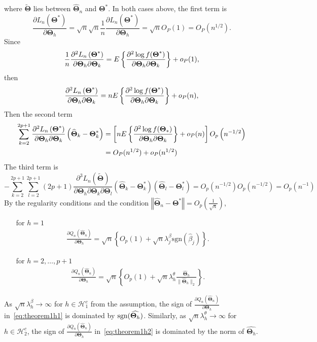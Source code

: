 \documentclass[12pt,letter]{article}\usepackage[]{graphicx}\usepackage[]{color}
\newcommand{\bTheta}{\boldsymbol{\Theta}}
\begin{document}
where $\widetilde{\bTheta}$ lies between $\widehat{\bTheta}_{n}$ and $\bTheta^{*}$. In both cases above, the first term is
\[
\frac{\partial L_{n}\left(\boldsymbol{\Theta}^{*}\right)}{\partial\bTheta_{h}}=\sqrt{n}\sqrt{n}\frac{1}{n}\frac{\partial L_{n}\left(\boldsymbol{\Theta}^{*}\right)}{\partial\bTheta_{h}}=\sqrt{n}O_{P}(1)=O_{P}(n^{1/2}).
\]
Since 
\[
\frac{1}{n}\frac{\partial^{2}L_{n}\left(\boldsymbol{\Theta}^{*}\right)}{\partial\bTheta_{h}\partial\bTheta_{k}}=E\left\{ \frac{\partial^{2}\log f(\bTheta^{*})}{\partial\bTheta_{h}\partial\bTheta_{k}}\right\} +\op(1),
\]
then
\[
\frac{\partial^{2}L_{n}\left(\boldsymbol{\Theta}^{*}\right)}{\partial\bTheta_{h}\partial\bTheta_{k}}=nE\left\{ \frac{\partial^{2}\log f(\bTheta^{*})}{\partial\bTheta_{h}\partial\bTheta_{k}}\right\} +\op(n),
\]
Then the second term
\begin{align*}
\sum_{k=2}^{2p+1}\frac{\partial^{2}L_{n}\left(\boldsymbol{\Theta}^{*}\right)}{\partial\bTheta_{h}\partial\bTheta_{k}}\left(\widehat{\bTheta}_{k}-\bTheta_{k}^{*}\right) & =\left[nE\left\{ \frac{\partial^{2}\log f(\bTheta_{*})}{\partial\bTheta_{h}\partial\bTheta_{k}}\right\} +\op(n)\right]O_{p}\left(n^{-1/2}\right)\\
& =O_{P}(n^{1/2})+o_{P}(n^{1/2})
\end{align*}
The third term is 
\[
-\sum_{k=2}^{2p+1}\sum_{l=2}^{2p+1}  (2p+1)\frac{\partial^{3}L_{n}(\widetilde{\bTheta})}{\partial\bTheta_{h}\partial\bTheta_{k}\partial\bTheta_{l}}\left(\widehat{\bTheta}_{k}-\bTheta_{k}^{*}\right)\left(\widehat{\bTheta}_{l}-\bTheta_{l}^{*}\right)=O_{p}\left(n^{-1/2}\right)O_{p}\left(n^{-1/2}\right)=O_{p}\left(n^{-1}\right)
\]
By the regularity conditions and the condition $\left\Vert \widehat{\boldsymbol{\Theta}}_{n}-\boldsymbol{\Theta}^{*}\right\Vert =O_{p}\left(\frac{1}{\sqrt{n}}\right)$,
\begin{itemize}
	\item[for] $h=1$  
	\begin{align}
\frac{\partial Q_{n}\left(\widehat{\boldsymbol{\Theta}}_{n}\right)}{\partial\bTheta_{h}}=\sqrt{n}\left\{ O_{p}(1)+\sqrt{n}\lambda_{j}^{\beta}\textrm{sgn}\left(\hat{\beta}_{j}\right)\right\} . \label{eq:theorem1h1}
\end{align}
\item[for] $h=2, \ldots, p+1$ 
	\begin{align}
\frac{\partial Q_{n}\left(\widehat{\boldsymbol{\Theta}}_{n}\right)}{\partial\bTheta_{h}}=\sqrt{n}\left\{ O_{p}(1)+\sqrt{n}\lambda_{h}^{\theta}\frac{\widehat{\bTheta}_{h}}{\|\widehat{\bTheta}_{h} \|_2}\right\} .\label{eq:theorem1h2}
\end{align}
\end{itemize}
As $\sqrt{n}\lambda_h^\beta\to\infty$ for $h\in\mathcal{H}_{1}^{c}$ from the assumption, the sign of $\frac{\partial Q_{n}\left(\widehat{\boldsymbol{\Theta}}_{n}\right)}{\partial\bTheta_{h}}$ in~\eqref{eq:theorem1h1} is dominated by $\textrm{sgn(\ensuremath{\widehat{\bTheta_{h}})}}$. Similarly, as $\sqrt{n}\lambda_h^\theta\to\infty$ for $h\in\mathcal{H}_{2}^{c}$, the sign of $\frac{\partial Q_{n}\left(\widehat{\boldsymbol{\Theta}}_{n}\right)}{\partial\bTheta_{h}}$ in~\eqref{eq:theorem1h2} is dominated by the norm of $\widehat{\bTheta_{h}}$. 
\end{document}
